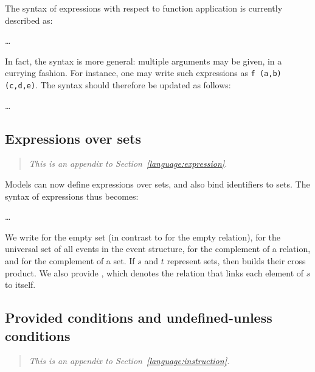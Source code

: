 The syntax of expressions with respect to function application is currently described as:
\begin{syntax}
 \is{} \dots 
\alt {} \T{(}  \T{)}
\end{syntax}

In fact, the syntax is more general: multiple arguments may be given, in a currying fashion. For instance, one may write such expressions as {\tt f (a,b) (c,d,e)}. The syntax should therefore be updated as follows:
\begin{syntax}
 \is{} \dots 
\alt {} \brepet \T{(}  \T{)} \erepet
\end{syntax}

\subsection{Expressions over sets}

\begin{quote}\it
This is an appendix to Section~\ref{language:expression}.
\end{quote}

Models can now define expressions over sets, and also bind identifiers to sets. The syntax of expressions thus becomes:

\begin{syntax}
 \is{} \ldots
\alt \T{\{\}}
\alt \T{\_}
\alt \T{\textasciitilde} 
\alt \T{!} 
\alt {} \T{*} 
\alt \T{[}  \T{]}
\end{syntax}

We write \synt{\T{\{\}}} for the empty set (in contrast to  for the empty relation), \synt{\T{\_}} for the universal set of all events in the event structure, \synt{\T{\textasciitilde}} for the complement of a relation, and \synt{\T{!}} for the complement of a set. If $s$ and $t$ represent sets, then  builds their cross product. We also provide \synt{\T{[} \text{$s$} \T{]}}, which denotes the relation that links each element of $s$ to itself.

\subsection{Provided conditions and undefined-unless conditions}

\begin{quote}\it
This is an appendix to Section~\ref{language:instruction}.
\end{quote}

